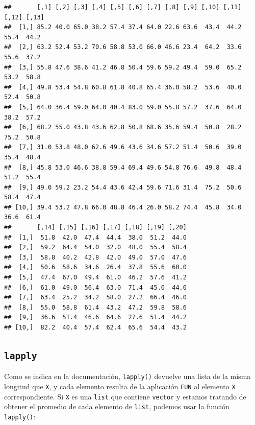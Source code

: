 \documentclass[
]{book}
\begin{document}
\begin{verbatim}
##       [,1] [,2] [,3] [,4] [,5] [,6] [,7] [,8] [,9] [,10] [,11] [,12] [,13]
##  [1,] 85.2 40.0 65.0 38.2 57.4 37.4 64.0 22.6 63.6  43.4  44.2  55.4  44.2
##  [2,] 63.2 52.4 53.2 70.6 58.8 53.0 66.0 46.6 23.4  64.2  33.6  55.6  37.2
##  [3,] 55.8 47.6 38.6 41.2 46.8 50.4 59.6 59.2 49.4  59.0  65.2  53.2  58.8
##  [4,] 49.8 53.4 54.8 60.8 61.8 40.8 65.4 36.0 58.2  53.6  40.0  52.4  50.8
##  [5,] 64.0 36.4 59.0 64.0 40.4 83.0 59.0 55.8 57.2  37.6  64.0  38.2  57.2
##  [6,] 68.2 55.0 43.8 43.6 62.8 50.8 68.6 35.6 59.4  50.8  28.2  75.2  50.8
##  [7,] 31.0 53.8 48.0 62.6 49.6 43.6 34.6 57.2 51.4  50.6  39.0  35.4  48.4
##  [8,] 45.8 53.0 46.6 38.8 59.4 69.4 49.6 54.8 76.6  49.8  48.4  51.2  55.4
##  [9,] 49.0 59.2 23.2 54.4 43.6 42.4 59.6 71.6 31.4  75.2  50.6  58.4  47.4
## [10,] 39.4 53.2 47.8 66.0 48.8 46.4 26.0 58.2 74.4  45.8  34.0  36.6  61.4
##       [,14] [,15] [,16] [,17] [,18] [,19] [,20]
##  [1,]  51.8  42.0  47.4  44.4  38.0  51.2  44.0
##  [2,]  59.2  64.4  54.0  32.0  48.0  55.4  58.4
##  [3,]  58.8  40.2  42.8  42.0  49.0  57.0  47.6
##  [4,]  50.6  58.6  34.6  26.4  37.8  55.6  60.0
##  [5,]  47.4  67.0  49.4  61.0  46.2  57.6  41.2
##  [6,]  61.0  49.0  56.4  63.0  71.4  45.0  44.0
##  [7,]  63.4  25.2  34.2  58.0  27.2  66.4  46.0
##  [8,]  55.0  58.8  61.4  43.2  47.2  59.8  58.6
##  [9,]  36.6  51.4  46.6  64.6  27.6  51.4  44.2
## [10,]  82.2  40.4  57.4  62.4  65.6  54.4  43.2
\end{verbatim}

\hypertarget{l17sapply}{%
\subsection{\texorpdfstring{\texttt{lapply}}{lapply}}\label{l17sapply}}

Como se indica en la documentación, \texttt{lapply()} devuelve una lista de la misma longitud que \texttt{X}, y cada elemento resulta de la aplicación \texttt{FUN} al elemento \texttt{X} correspondiente. Si \texttt{X} es una \texttt{list} que contiene \texttt{vector} y estamos tratando de obtener el promedio de cada elemento de \texttt{list}, podemos usar la función \texttt{lapply()}:
\end{document}
